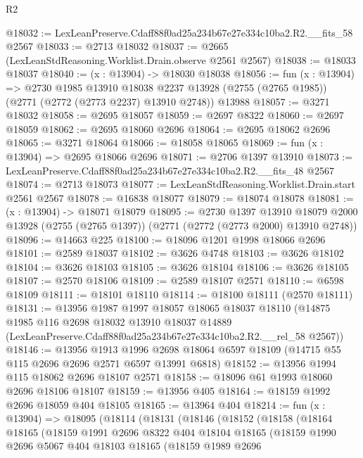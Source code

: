 \begin{lexlean}{R2}
\begin{coremodule}
@18032 := LexLeanPreserve.Cdaff88f0ad25a234b67e27e334c10ba2.R2.__fits_58 @2567
@18033 := @2713 @18032
@18037 := @2665 (LexLeanStdReasoning.Worklist.Drain.observe @2561 @2567)
@18038 := @18033 @18037
@18040 := (x : @13904) -> @18030 @18038
@18056 := fun (x : @13904) =>
  @2730
    @1985
    @13910
    @18038
    @2237
    @13928
    (@2755 (@2765 @1985))
    (@2771 (@2772 (@2773 @2237) @13910 @2748))
    @13988
@18057 := @3271 @18032
@18058 := @2695 @18057
@18059 := @2697 @8322
@18060 := @2697 @18059
@18062 := @2695 @18060 @2696
@18064 := @2695 @18062 @2696
@18065 := @3271 @18064
@18066 := @18058 @18065
@18069 := fun (x : @13904) => @2695 @18066 @2696
@18071 := @2706 @1397 @13910
@18073 := LexLeanPreserve.Cdaff88f0ad25a234b67e27e334c10ba2.R2.__fits_48 @2567
@18074 := @2713 @18073
@18077 := LexLeanStdReasoning.Worklist.Drain.start @2561 @2567
@18078 := @16838 @18077
@18079 := @18074 @18078
@18081 := (x : @13904) -> @18071 @18079
@18095 := @2730
    @1397
    @13910
    @18079
    @2000
    @13928
    (@2755 (@2765 @1397))
    (@2771 (@2772 (@2773 @2000) @13910 @2748))
@18096 := @14663 @225
@18100 := @18096 @1201 @1998 @18066 @2696
@18101 := @2589 @18037
@18102 := @3626 @4748
@18103 := @3626 @18102
@18104 := @3626 @18103
@18105 := @3626 @18104
@18106 := @3626 @18105
@18107 := @2570 @18106
@18109 := @2589 @18107 @2571
@18110 := @6598 @18109
@18111 := @18101 @18110
@18114 := @18100 @18111 (@2570 @18111)
@18131 := @13956
    @1987
    @1997
    @18057
    @18065
    @18037
    @18110
    (@14875
      @1985
      @116
      @2698
      @18032
      @13910
      @18037
      @14889
      (LexLeanPreserve.Cdaff88f0ad25a234b67e27e334c10ba2.R2.__rel_58 @2567))
@18146 := @13956
    @1913
    @1996
    @2698
    @18064
    @6597
    @18109
    (@14715 @55 @115 @2696 @2696 @2571 @6597 @13991 @6818)
@18152 := @13956 @1994 @115 @18062 @2696 @18107 @2571
@18158 := @18096 @61 @1993 @18060 @2696 @18106 @18107
@18159 := @13956 @405
@18164 := @18159 @1992 @2696 @18059 @404 @18105
@18165 := @13964 @404
@18214 := fun (x : @13904) =>
  @18095
    (@18114
      (@18131
        (@18146
          (@18152
            (@18158
              (@18164
                @18165
                (@18159
                  @1991
                  @2696
                  @8322
                  @404
                  @18104
                  @18165
                  (@18159
                    @1990
                    @2696
                    @5067
                    @404
                    @18103
                    @18165
                    (@18159
                      @1989
                      @2696

\end{coremodule}
\end{lexlean}
